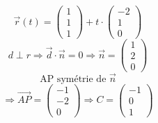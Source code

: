\documentclass{article}
\begin{document}
\[ \vec{r}(t) = \begin{pmatrix} 1 \\ 1 \\ 1 \end{pmatrix} + t \cdot \begin{pmatrix} -2 \\ 1 \\ 0 \end{pmatrix} \]
\[ d \perp r \Rightarrow \vec{d} \cdot \vec{n} = 0 \Rightarrow \vec{n} = \begin{pmatrix} 1 \\ 2 \\ 0 \end{pmatrix} \]
\[ \text{AP symétrie de } \vec{n} \]
\[ \Rightarrow \vec{AP} = \begin{pmatrix} -1 \\ -2 \\ 0 \end{pmatrix} \Rightarrow C = \begin{pmatrix} -1 \\ 0 \\ 1 \end{pmatrix} \]
\end{document}
